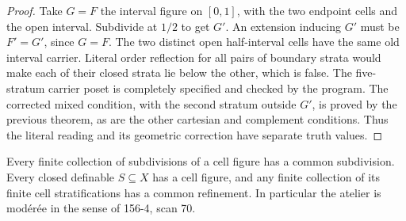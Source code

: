 \begin{proof}
Take \(G=F\) the interval figure on \([0,1]\),
with the two endpoint cells and the open interval.
Subdivide at \(1/2\) to get \(G'\).
An extension inducing \(G'\) must be \(F'=G'\),
since \(G=F\). The two distinct open half-interval
cells have the same old interval carrier.
Literal order reflection for all pairs
of boundary strata would make each
of their closed strata lie below the other,
which is false. The five-stratum carrier
poset is completely specified and checked
by the program. The corrected mixed
condition, with the second stratum
outside \(G'\), is proved by the
previous theorem, as are the other
cartesian and complement conditions.
Thus the literal reading and its
geometric correction have separate
truth values.
\end{proof}

\begin{theorem}\label{SA21-BM-cell-moderation}
Every finite collection of subdivisions of a cell figure
has a common subdivision. Every closed definable
\(S\subseteq X\) has a cell figure, and any finite
collection of its finite cell stratifications
has a common refinement. In particular the
atelier is modérée in the sense of 156-4, scan 70.
\end{theorem}

